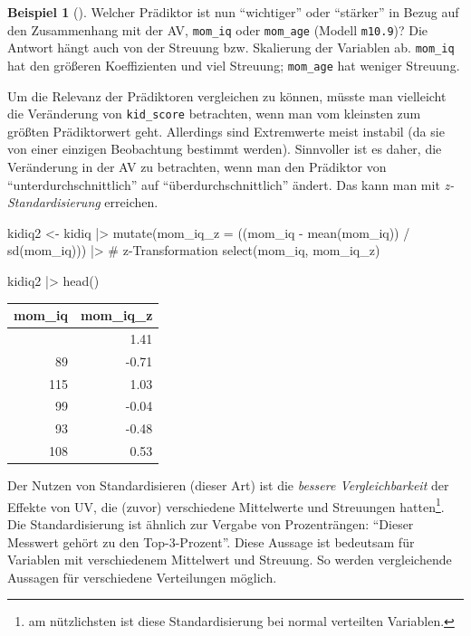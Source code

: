 \documentclass[
  ngerman,
  letterpaper,
  twoside,
  open=any]{scrbook}
\newenvironment{Shaded}{\begin{snugshade}}{\end{snugshade}}
\newcommand{\AttributeTok}[1]{\textcolor[rgb]{0.40,0.45,0.13}{#1}}
\newcommand{\CommentTok}[1]{\textcolor[rgb]{0.37,0.37,0.37}{#1}}
\newcommand{\FunctionTok}[1]{\textcolor[rgb]{0.28,0.35,0.67}{#1}}
\newcommand{\NormalTok}[1]{\textcolor[rgb]{0.00,0.23,0.31}{#1}}
\newcommand{\OtherTok}[1]{\textcolor[rgb]{0.00,0.23,0.31}{#1}}
\newcommand{\SpecialCharTok}[1]{\textcolor[rgb]{0.37,0.37,0.37}{#1}}
\newcounter{none} %
\theoremstyle{definition}
\newtheorem{example}{Beispiel}[chapter]
\theoremstyle{plain}
\theoremstyle{definition}
\theoremstyle{definition}
\theoremstyle{remark}
\begin{document}
\begin{example}[]
Welcher Prädiktor ist nun \enquote{wichtiger} oder \enquote{stärker} in
Bezug auf den Zusammenhang mit der AV, \texttt{mom\_iq} oder
\texttt{mom\_age} (Modell \texttt{m10.9})? Die Antwort hängt auch von
der Streuung bzw. Skalierung der Variablen ab. \texttt{mom\_iq} hat den
größeren Koeffizienten und viel Streuung; \texttt{mom\_age} hat weniger
Streuung.

Um die Relevanz der Prädiktoren vergleichen zu können, müsste man
vielleicht die Veränderung von \texttt{kid\_score} betrachten, wenn man
vom kleinsten zum größten Prädiktorwert geht. Allerdings sind
Extremwerte meist instabil (da sie von einer einzigen Beobachtung
bestimmt werden). Sinnvoller ist es daher, die Veränderung in der AV zu
betrachten, wenn man den Prädiktor von \enquote{unterdurchschnittlich}
auf \enquote{überdurchschnittlich} ändert. Das kann man mit
\emph{z-Standardisierung} erreichen.

\begin{Shaded}
\begin{Highlighting}[]
\NormalTok{kidiq2 }\OtherTok{\textless{}{-}} 
\NormalTok{  kidiq }\SpecialCharTok{|\textgreater{}} 
  \FunctionTok{mutate}\NormalTok{(}\AttributeTok{mom\_iq\_z =}\NormalTok{ ((mom\_iq }\SpecialCharTok{{-}} \FunctionTok{mean}\NormalTok{(mom\_iq)) }\SpecialCharTok{/} \FunctionTok{sd}\NormalTok{(mom\_iq)))  }\SpecialCharTok{|\textgreater{}}  \CommentTok{\# z{-}Transformation}
  \FunctionTok{select}\NormalTok{(mom\_iq, mom\_iq\_z) }

\NormalTok{kidiq2 }\SpecialCharTok{|\textgreater{}} 
  \FunctionTok{head}\NormalTok{()}
\end{Highlighting}
\end{Shaded}

{\def\LTcaptype{none} %
\begin{longtable}[]{@{}rr@{}}
\toprule\noalign{}
mom\_iq & mom\_iq\_z \\
\midrule\noalign{}
\endhead
\bottomrule\noalign{}
\endlastfoot
121 & 1.41 \\
89 & -0.71 \\
115 & 1.03 \\
99 & -0.04 \\
93 & -0.48 \\
108 & 0.53 \\
\end{longtable}
}

Der Nutzen von Standardisieren (dieser Art) ist die \emph{bessere
Vergleichbarkeit} der Effekte von UV, die (zuvor) verschiedene
Mittelwerte und Streuungen hatten\footnote{am nützlichsten ist diese
  Standardisierung bei normal verteilten Variablen.}. Die
Standardisierung ist ähnlich zur Vergabe von Prozenträngen:
\enquote{Dieser Messwert gehört zu den Top-3-Prozent}. Diese Aussage ist
bedeutsam für Variablen mit verschiedenem Mittelwert und Streuung. So
werden vergleichende Aussagen für verschiedene Verteilungen möglich.


\end{example}
\end{document}
